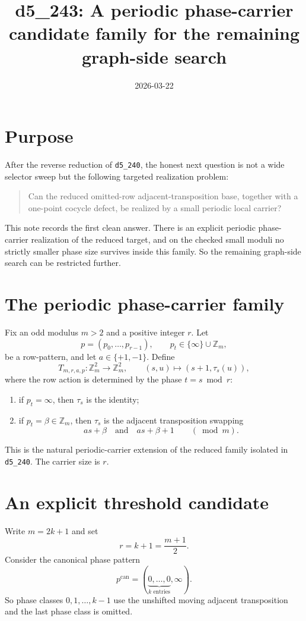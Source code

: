 \documentclass[11pt]{article}
\title{d5\_243: A periodic phase-carrier candidate family for the remaining graph-side search}
\author{}
\date{2026-03-22}
\begin{document}
\maketitle

\section{Purpose}
After the reverse reduction of \texttt{d5\_240}, the honest next question is not a
wide selector sweep but the following targeted realization problem:
\begin{quote}
Can the reduced omitted-row adjacent-transposition base, together with a
one-point cocycle defect, be realized by a small periodic local carrier?
\end{quote}
This note records the first clean answer.
There is an explicit periodic phase-carrier realization of the reduced target,
and on the checked small moduli no strictly smaller phase size survives inside
this family.
So the remaining graph-side search can be restricted further.

\section{The periodic phase-carrier family}
Fix an odd modulus $m>2$ and a positive integer $r$.
Let
\[
 p=(p_0,\dots,p_{r-1}),
 \qquad p_t\in \{\infty\}\cup \mathbb Z_m,
\]
be a row-pattern, and let $a\in\{+1,-1\}$.
Define
\[
 T_{m,r,a,p}\colon \mathbb Z_m^2\to \mathbb Z_m^2,
 \qquad (s,u)\mapsto (s+1,\tau_s(u)),
\]
where the row action is determined by the phase $t=s\bmod r$:
\begin{enumerate}[label=\textup{(\roman*)},leftmargin=2.7em]
\item if $p_t=\infty$, then $\tau_s$ is the identity;
\item if $p_t=\beta\in\mathbb Z_m$, then $\tau_s$ is the adjacent
      transposition swapping
      \[
      a s+\beta \quad\text{and}\quad a s+\beta+1
      \qquad (\bmod m).
      \]
\end{enumerate}
This is the natural periodic-carrier extension of the reduced family isolated in
\texttt{d5\_240}.
The carrier size is $r$.

\section{An explicit threshold candidate}
Write $m=2k+1$ and set
\[
 r=k+1=\frac{m+1}{2}.
\]
Consider the canonical phase pattern
\[
 p^{\mathrm{can}}=(\underbrace{0,\dots,0}_{k\text{ entries}},\infty).
\]
So phase classes $0,1,\dots,k-1$ use the unshifted moving adjacent transposition
and the last phase class is omitted.
\end{document}
